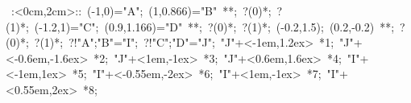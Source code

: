 \hbox{
\xy    <2cm,0cm>:<0cm,2cm>::
       (-1,0)="A"; (1,0.866)="B" **\dir{-}; ?(0)*\dir{<}; ?(1)*\dir{>};
       (-1.2,1)="C"; (0.9,1.166)="D" **\dir{-}; ?(0)*\dir{<}; ?(1)*\dir{>};
       (-0.2,1.5); (0.2,-0.2) **\dir{-}; ?(0)*\dir{<}; ?(1)*\dir{>};
       ?!{"A";"B"}="I";  ?!{"C";"D"}="J"; 
       "J"+<-1em,1.2ex> *{1};
       "J"+<-0.6em,-1.6ex> *{2};
       "J"+<1em,-1ex> *{3};
       "J"+<0.6em,1.6ex> *{4};
       "I"+<-1em,1ex> *{5};
       "I"+<-0.55em,-2ex> *{6};
       "I"+<1em,-1ex> *{7};
       "I"+<0.55em,2ex> *{8};
\endxy}

